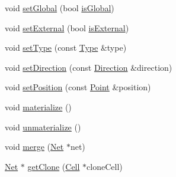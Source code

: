 \begin{DoxyCompactItemize}
\item 
void \hyperlink{classHurricane_1_1Net_a35c84afd9dade0cb715602bcf8ec8865}{set\-Global} (bool \hyperlink{classHurricane_1_1Net_a2d3d69e66f8f02069ba05949c3fd14d7}{is\-Global})
\item 
void \hyperlink{classHurricane_1_1Net_a6a30bc8282ce7e4b936e73a11549fedf}{set\-External} (bool \hyperlink{classHurricane_1_1Net_a50ff53a7db9ab8653dd122a6d2b90de4}{is\-External})
\item 
void \hyperlink{classHurricane_1_1Net_a83f5ce12291b0ec5ab584d515dd8963c}{set\-Type} (const \hyperlink{classHurricane_1_1Net_1_1Type}{Type} \&type)
\item 
void \hyperlink{classHurricane_1_1Net_ac33d13bb0ddc60f369d5bfcffc4bb0f8}{set\-Direction} (const \hyperlink{classHurricane_1_1Net_1_1Direction}{Direction} \&direction)
\item 
void \hyperlink{classHurricane_1_1Net_a0a3a3232a74ebced14b14029c5199561}{set\-Position} (const \hyperlink{classHurricane_1_1Point}{Point} \&position)
\item 
void \hyperlink{classHurricane_1_1Net_ae46f7e4a9b00b265c06cb6e0ee00b806}{materialize} ()
\item 
void \hyperlink{classHurricane_1_1Net_a9e53a3d54b61f7081263e6d7b4fa81b9}{unmaterialize} ()
\item 
void \hyperlink{classHurricane_1_1Net_a442f62d23364805f39816cd543284886}{merge} (\hyperlink{classHurricane_1_1Net}{Net} $\ast$net)
\item 
\hyperlink{classHurricane_1_1Net}{Net} $\ast$ \hyperlink{classHurricane_1_1Net_a4bd27e6ae22606463491c28437c4068f}{get\-Clone} (\hyperlink{classHurricane_1_1Cell}{Cell} $\ast$clone\-Cell)
\end{DoxyCompactItemize}

